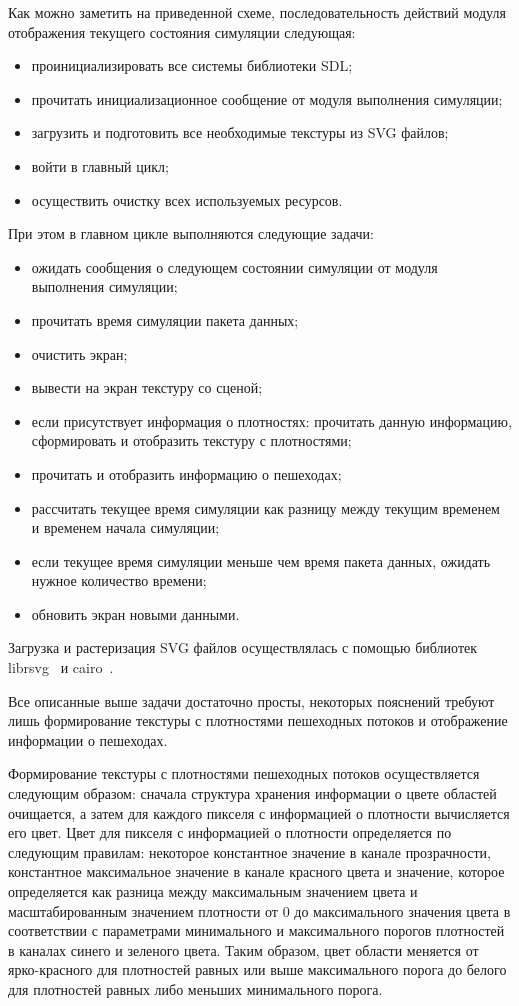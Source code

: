 Как можно заметить на приведенной схеме, последовательность действий модуля отображения текущего состояния симуляции следующая:
\begin{itemize}
  \item проинициализировать все системы библиотеки SDL;
  \item прочитать инициализационное сообщение от модуля выполнения симуляции;
  \item загрузить и подготовить все необходимые текстуры из SVG файлов;
  \item войти в главный цикл;
  \item осуществить очистку всех используемых ресурсов.
\end{itemize}

При этом в главном цикле выполняются следующие задачи:
\begin{itemize}
  \item ожидать сообщения о следующем состоянии симуляции от модуля выполнения симуляции;
  \item прочитать время симуляции пакета данных;
  \item очистить экран;
  \item вывести на экран текстуру со сценой;
  \item если присутствует информация о плотностях: прочитать данную информацию, сформировать и отобразить текстуру с плотностями;
  \item прочитать и отобразить информацию о пешеходах;
  \item рассчитать текущее время симуляции как разницу между текущим временем и временем начала симуляции;
  \item если текущее время симуляции меньше чем время пакета данных, ожидать нужное количество времени;
  \item обновить экран новыми данными.
\end{itemize}

Загрузка и растеризация SVG файлов осуществлялась с помощью библиотек librsvg~\cite{librsvg_home} и cairo~\cite{cairo_home}.

Все описанные выше задачи достаточно просты, некоторых пояснений требуют лишь формирование текстуры с плотностями пешеходных потоков и отображение информации о пешеходах.

Формирование текстуры с плотностями пешеходных потоков осуществляется следующим образом:
сначала структура хранения информации о цвете областей очищается,
а затем для каждого пикселя с информацией о плотности вычисляется его цвет.
Цвет для пикселя с информацией о плотности определяется по следующим правилам:
некоторое константное значение в канале прозрачности,
константное максимальное значение в канале красного цвета и
значение, которое определяется как разница между максимальным значением цвета и масштабированным значением плотности от 0 до максимального значения цвета
в соответствии с параметрами минимального и максимального порогов плотностей в каналах синего и зеленого цвета.
Таким образом, цвет области меняется от ярко-красного для плотностей равных или выше максимального порога до белого для плотностей равных либо меньших минимального порога.

